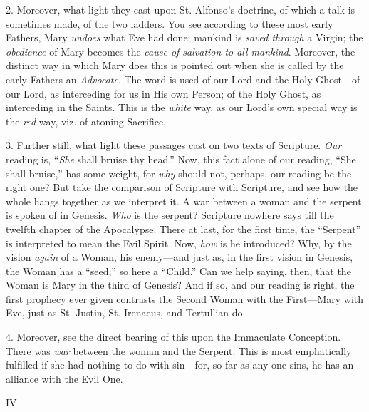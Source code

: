 2. Moreover, what light they
cast upon St. Alfonso's doctrine, of which a talk is sometimes made, of
the two ladders. You see according to these most early Fathers, Mary \emph{undoes}
what Eve had done; mankind is \emph{saved through} a Virgin; the \emph{obedience}
of Mary becomes the \emph{cause of salvation to all mankind}. Moreover,
the distinct way in which Mary does this is pointed out when she is
called by the early Fathers an \emph{Advocate}. The word is used of our
Lord and the Holy Ghost—of our Lord, as interceding for us in His
own Person; of the Holy Ghost, as interceding in the Saints. This is the
\emph{white} way, as our Lord's own special way is the \emph{red} way,
viz. of atoning Sacrifice.

3. Further still, what light
these passages cast on two texts of Scripture. \emph{Our} reading is, ``\emph{She}
shall bruise thy head.'' Now, this fact alone of our reading, ``She shall
bruise,'' has some weight, for \emph{why} should not, perhaps, our
reading be the right one? But take the comparison of Scripture with
Scripture, and see how the whole hangs together as we interpret it. A
war between a woman and the serpent is spoken of in Genesis. \emph{Who}
is the serpent? Scripture nowhere says till the twelfth chapter of the
Apocalypse. There at last, for the first time, the ``Serpent'' is
interpreted to mean the Evil Spirit. Now, \emph{how} is he introduced?
Why, by the vision \emph{again} of a Woman, his enemy—and just as, in
the first vision in Genesis, the Woman has a ``seed,'' so here a ``Child.''
Can we help saying, then, that the Woman is Mary in the third of
Genesis? And if so, and our reading is right, the first prophecy ever
given contrasts the Second Woman with the First—Mary with Eve, just as
St. Justin, St. Irenaeus, and Tertullian do.

4. Moreover, see the direct
bearing of this upon the Immaculate Conception. There was \emph{war}
between the woman and the Serpent. This is most emphatically fulfilled
if she had nothing to do with sin—for, so far as any one sins, he has
an alliance with the Evil One.

IV


